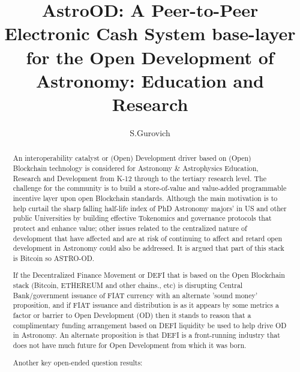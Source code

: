 \documentclass[final,5p,times,twocolumn,authoryear]{elsarticle}
\begin{document}
\begin{frontmatter}

\title{ AstroOD: A Peer-to-Peer Electronic Cash System base-layer for the Open Development of Astronomy: Education and Research}
 
    \author[iate,wsu]{S.Gurovich}
  
\address[iate]{
   Instituto De Astronom\'ia Te\'orica y Experimental -
   Observatorio Astron\'omico C\'ordoba (IATE--OAC--UNC--CONICET),
   Laprida 854, X5000BGR, C\'ordoba, Argentina}
\address[wsu]{
   Western Sydney University, Kingswood campus, NSW, Argentina
}

\begin{abstract}

An interoperability catalyst or (Open) Development driver based on (Open) Blockchain technology is considered for Astronomy \& Astrophysics Education, Research and Development from K-12 through to the tertiary research level. The challenge for the community is to build a store-of-value and value-added programmable incentive layer upon open Blockchain standards. Although the main motivation is to help curtail the sharp falling half-life index of PhD Astronomy majors' in US and other public Universities by building effective Tokenomics and governance protocols that protect and enhance value; other issues related to the centralized nature of development that have affected and are at risk of continuing to affect and retard open development in Astronomy could also be addressed. It is argued that part of this stack is Bitcoin so ASTRO-OD. 

If the Decentralized Finance Movement or DEFI that is based on the Open Blockchain stack (Bitcoin, ETHEREUM and other chains., etc) is disrupting Central Bank/government issuance of FIAT currency with an alternate 'sound money' proposition, and if FIAT issuance and distribution is as it appears by some metrics a factor or barrier to Open Development (OD) then it stands to reason that a complimentary funding arrangement based on DEFI liquidity be used to help drive OD in Astronomy. An alternate proposition is that DEFI is a front-running industry that does not have much future for Open Development from which it was born.

Another key open-ended question results: 


\end{abstract}
\end{frontmatter}
\end{document}
